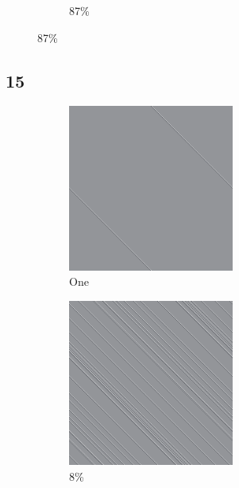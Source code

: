 \documentclass[12pt, fleqn]{report}                             %
\theoremstyle{break}                                            %
\begin{document}
\begin{figure}[ht!]
\begin{subfigure}[b]{0.4\linewidth}
          \caption{87\%}
        \end{subfigure}
      \end{figure}


      \clearpage
      \subsection{15}
      \begin{figure}[ht!]
        \centering
        \begin{subfigure}[b]{0.4\linewidth}
          \includegraphics[width=0.6\textwidth]{Images/15/a.png}
          \caption{One}
        \end{subfigure}
        \begin{subfigure}[b]{0.4\linewidth}
          \includegraphics[width=0.6\textwidth]{Images/15/b.png}
          \caption{8\%}
        \end{subfigure}
        \begin{subfigure}[b]{0.4\linewidth}

\end{subfigure}
\end{figure}
\end{document}
